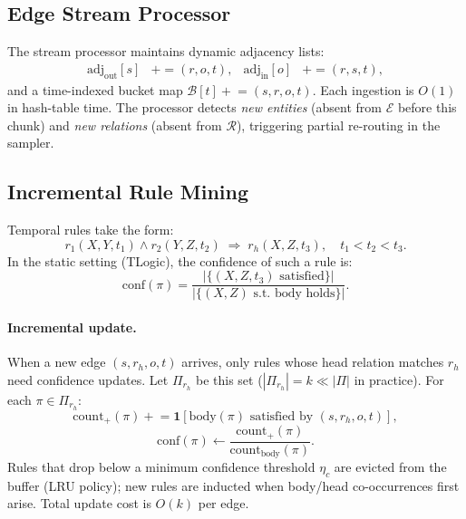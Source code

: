 \documentclass[10pt,twocolumn]{article}
\theoremstyle{definition}
\newcommand{\calE}{\mathcal{E}}
\newcommand{\calR}{\mathcal{R}}
\begin{document}
\subsection{Edge Stream Processor}
\label{sec:stream}

The stream processor maintains dynamic adjacency lists:
\begin{align}
  \text{adj}_{\text{out}}[s] &\mathrel{+}= (r, o, t), &
  \text{adj}_{\text{in}}[o]  &\mathrel{+}= (r, s, t),
\end{align}
and a time-indexed bucket map $\mathcal{B}[t] \mathrel{+}= (s,r,o,t)$.
Each ingestion is $O(1)$ in hash-table time.
The processor detects \emph{new entities} (absent from $\calE$ before this
chunk) and \emph{new relations} (absent from $\calR$), triggering partial
re-routing in the sampler.

\subsection{Incremental Rule Mining}
\label{sec:incr_rules}

Temporal rules take the form:
\begin{equation}
  r_1(X, Y, t_1) \wedge r_2(Y, Z, t_2) \;\Rightarrow\; r_h(X, Z, t_3),
  \quad t_1 < t_2 < t_3.
\end{equation}
In the static setting (TLogic), the confidence of such a rule is:
\begin{equation}
  \text{conf}(\pi) = \frac{|\{(X,Z,t_3)\text{ satisfied}\}|}{
                          |\{(X,Z) \text{ s.t.\ body holds}\}|}.
\end{equation}
\paragraph{Incremental update.}
When a new edge $(s, r_h, o, t)$ arrives, only rules whose head relation
matches $r_h$ need confidence updates.
Let $\Pi_{r_h}$ be this set ($|\Pi_{r_h}| = k \ll |\Pi|$ in practice).
For each $\pi \in \Pi_{r_h}$:
\begin{equation}
  \text{count}_+(\pi) \mathrel{+}= \mathbf{1}[\text{body}(\pi)\text{ satisfied by }(s,r_h,o,t)],
\end{equation}
\begin{equation}
  \text{conf}(\pi) \leftarrow
    \frac{\text{count}_+(\pi)}{\text{count}_{\text{body}}(\pi)}.
\end{equation}
Rules that drop below a minimum confidence threshold $\eta_c$ are evicted
from the buffer (LRU policy); new rules are inducted when body/head
co-occurrences first arise.
Total update cost is $O(k)$ per edge.
\end{document}

